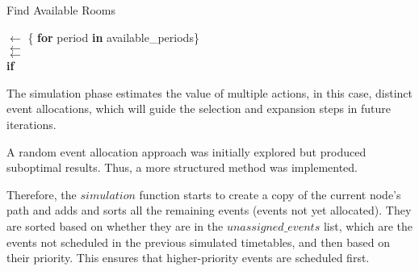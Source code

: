\begin{algorithm}
\caption{Find Available Rooms}\label{find_available_rooms}
\begin{algorithmic}[1]
    \State {} $\gets$ \{ \textbf{for} period \textbf{in} available\_periods\}
    \\
        \State {} $\gets$ 
            \State {}
        \EndIf
    \EndFor
    \\
    \State {} $\gets$ 
    \\
            \State {} 
            \textbf{if} 
        \EndIf
    \EndFor
    \\
    \State \Return {}
\EndFunction
\end{algorithmic}
\end{algorithm}

The simulation phase estimates the value of multiple actions, in this case, distinct event allocations, which will guide the selection and expansion steps in future iterations. 

A random event allocation approach was initially explored but produced suboptimal results. Thus, a more structured method was implemented.

Therefore, the \(simulation\) function starts to create a copy of the current node's path and adds and sorts all the remaining events (events not yet allocated). They are sorted based on whether they are in the \(unassigned\_events\) list, which are the events not scheduled in the previous simulated timetables, and then based on their priority. This ensures that higher-priority events are scheduled first.

